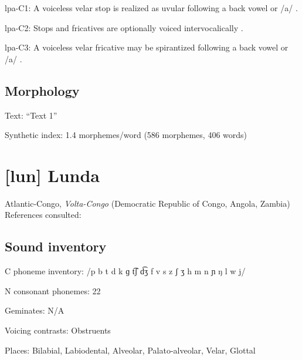 {\begin{appendixdesc}
\item[lpa-C1:] A voiceless velar stop is realized as uvular following a back vowel or /a/ \citep[19]{Lacrampe2014}.

\item[lpa-C2:] Stops and fricatives are optionally voiced intervocalically \citep[17]{Lacrampe2014}.

\item[lpa-C3:] A voiceless velar fricative may be spirantized following a back vowel or /a/ \citep[20]{Lacrampe2014}.
\end{appendixdesc}
\subsection*{Morphology}

\begin{appendixdesc}

\item[Text:] “Text 1” \citep[495--500]{Lacrampe2014}

\item[Synthetic index:] 1.4 morphemes/word (586 morphemes, 406 words)
\end{appendixdesc}
\newpage\section*{[lun] Lunda}  %
Atlantic-Congo, \textit{Volta-Congo} (Democratic Republic of Congo, Angola, Zambia)\medskip\\
References consulted: \citet{Kawasha2003}

\subsection*{Sound inventory}
\begin{appendixdesc}

\item[C phoneme inventory:] /p b t d k ɡ t͡ʃ d͡ʒ f v s z ʃ ʒ h m n ɲ ŋ l w j/

\item[N consonant phonemes:] 22

\item[Geminates:] N/A

\item[Voicing contrasts:] Obstruents

\item[Places:] Bilabial, Labiodental, Alveolar, Palato-alveolar, Velar, Glottal


\end{appendixdesc}}
